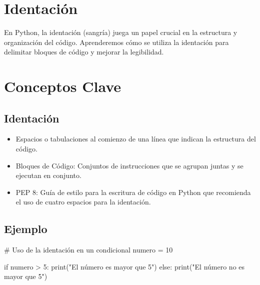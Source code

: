 \documentclass[
  a4paper,
  DIV=11,
  numbers=noendperiod,
  onepage,
  openany]{scrreprt}
\newenvironment{Shaded}{\begin{snugshade}}{\end{snugshade}}
\newcommand{\BuiltInTok}[1]{\textcolor[rgb]{0.00,0.23,0.31}{#1}}
\newcommand{\CommentTok}[1]{\textcolor[rgb]{0.37,0.37,0.37}{#1}}
\newcommand{\ControlFlowTok}[1]{\textcolor[rgb]{0.00,0.23,0.31}{#1}}
\newcommand{\DecValTok}[1]{\textcolor[rgb]{0.68,0.00,0.00}{#1}}
\newcommand{\NormalTok}[1]{\textcolor[rgb]{0.00,0.23,0.31}{#1}}
\newcommand{\OperatorTok}[1]{\textcolor[rgb]{0.37,0.37,0.37}{#1}}
\newcommand{\StringTok}[1]{\textcolor[rgb]{0.13,0.47,0.30}{#1}}
\providecommand{\tightlist}{%
  \setlength{\itemsep}{0pt}\setlength{\parskip}{0pt}}\usepackage{longtable,booktabs,array}
\begin{document}
\hypertarget{identaciuxf3n-2}{%
\section{Identación}\label{identaciuxf3n-2}}

En Python, la identación (sangría) juega un papel crucial en la
estructura y organización del código. Aprenderemos cómo se utiliza la
identación para delimitar bloques de código y mejorar la legibilidad.

\hypertarget{conceptos-clave-7}{%
\section{Conceptos Clave}\label{conceptos-clave-7}}

\hypertarget{identaciuxf3n-3}{%
\subsection{Identación}\label{identaciuxf3n-3}}

\begin{itemize}
\tightlist
\item
  Espacios o tabulaciones al comienzo de una línea que indican la
  estructura del código.
\item
  Bloques de Código: Conjuntos de instrucciones que se agrupan juntas y
  se ejecutan en conjunto.
\item
  PEP 8: Guía de estilo para la escritura de código en Python que
  recomienda el uso de cuatro espacios para la identación.
\end{itemize}

\hypertarget{ejemplo-7}{%
\subsection{Ejemplo}\label{ejemplo-7}}

\begin{Shaded}
\begin{Highlighting}[]
\CommentTok{\# Uso de la identación en un condicional}
\NormalTok{numero }\OperatorTok{=} \DecValTok{10}

\ControlFlowTok{if}\NormalTok{ numero }\OperatorTok{\textgreater{}} \DecValTok{5}\NormalTok{:}
    \BuiltInTok{print}\NormalTok{(}\StringTok{"El número es mayor que 5"}\NormalTok{)}
\ControlFlowTok{else}\NormalTok{:}
    \BuiltInTok{print}\NormalTok{(}\StringTok{"El número no es mayor que 5"}\NormalTok{)}
\end{Highlighting}
\end{Shaded}
\end{document}
